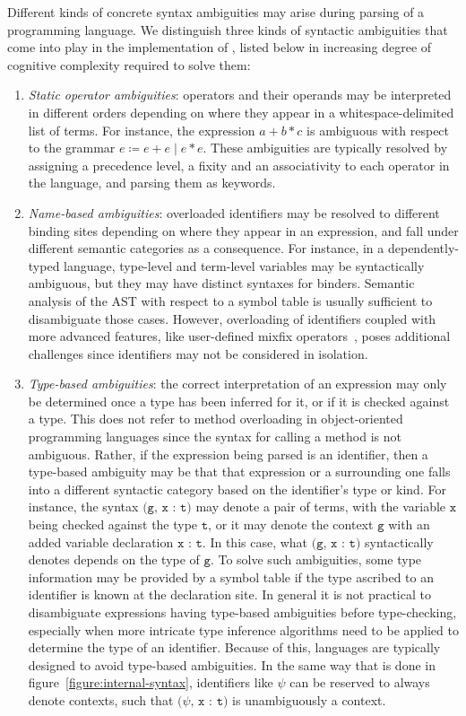 Different kinds of concrete syntax ambiguities may arise during parsing of a programming language.
We distinguish three kinds of syntactic ambiguities that come into play in the implementation of \Beluga, listed below in increasing degree of cognitive complexity required to solve them:
\begin{enumerate}
\item
\textit{Static operator ambiguities}: operators and their operands may be interpreted in different orders depending on where they appear in a whitespace-delimited list of terms.
For instance, the expression $a + b * c$ is ambiguous with respect to the grammar $e\coloneqq e+e\mid e*e$.
These ambiguities are typically resolved by assigning a precedence level, a fixity and an associativity to each operator in the language, and parsing them as keywords.
\item
\textit{Name-based ambiguities}: overloaded identifiers may be resolved to different binding sites depending on where they appear in an expression, and fall under different semantic categories as a consequence.
For instance, in a dependently-typed language, type-level and term-level variables may be syntactically ambiguous, but they may have distinct syntaxes for binders.
Semantic analysis of the \ac{AST} with respect to a symbol table is usually sufficient to disambiguate those cases.
However, overloading of identifiers coupled with more advanced features, like user-defined mixfix operators~\cite{danielsson2008parsing}, poses additional challenges since identifiers may not be considered in isolation.
\item
\textit{Type-based ambiguities}: the correct interpretation of an expression may only be determined once a type has been inferred for it, or if it is checked against a type.
This does not refer to method overloading in object-oriented programming languages since the syntax for calling a method is not ambiguous.
Rather, if the expression being parsed is an identifier, then a type-based ambiguity may be that that expression or a surrounding one falls into a different syntactic category based on the identifier's type or kind.
For instance, the syntax $ \texttt{(g, x : t)} $ may denote a pair of terms, with the variable $ \texttt{x} $ being checked against the type $ \texttt{t} $, or it may denote the context $ \texttt{g} $ with an added variable declaration $ \texttt{x : t} $.
In this case, what $ \texttt{(g, x : t)} $ syntactically denotes depends on the type of $ \texttt{g} $.
To solve such ambiguities, some type information may be provided by a symbol table if the type ascribed to an identifier is known at the declaration site.
In general it is not practical to disambiguate expressions having type-based ambiguities before type-checking, especially when more intricate type inference algorithms need to be applied to determine the type of an identifier.
Because of this, languages are typically designed to avoid type-based ambiguities.
In the same way that is done in figure~\ref{figure:internal-syntax}, identifiers like $\psi$ can be reserved to always denote contexts, such that $\texttt{($\psi$, x : t)}$ is unambiguously a context.
\end{enumerate}

